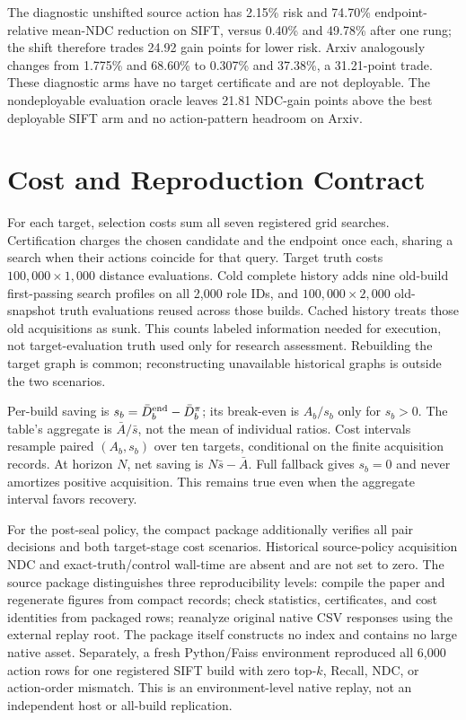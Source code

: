 \documentclass[sigconf,anonymous]{acmart}
\begin{document}
The diagnostic unshifted source action has 2.15\% risk and 74.70\% endpoint-relative mean-NDC reduction on SIFT, versus 0.40\% and 49.78\% after one rung; the shift therefore trades 24.92 gain points for lower risk. Arxiv analogously changes from 1.775\% and 68.60\% to 0.307\% and 37.38\%, a 31.21-point trade. These diagnostic arms have no target certificate and are not deployable. The nondeployable evaluation oracle leaves 21.81 NDC-gain points above the best deployable SIFT arm and no action-pattern headroom on Arxiv.

\section{Cost and Reproduction Contract}
For each target, selection costs sum all seven registered grid searches. Certification charges the chosen candidate and the endpoint once each, sharing a search when their actions coincide for that query. Target truth costs $100{,}000\times1{,}000$ distance evaluations. Cold complete history adds nine old-build first-passing search profiles on all 2,000 role IDs, and $100{,}000\times2{,}000$ old-snapshot truth evaluations reused across those builds. Cached history treats those old acquisitions as sunk. This counts labeled information needed for execution, not target-evaluation truth used only for research assessment. Rebuilding the target graph is common; reconstructing unavailable historical graphs is outside the two scenarios.

Per-build saving is $s_b=\bar D_b^{\rm end}-\bar D_b^{\pi}$; its break-even is $A_b/s_b$ only for $s_b>0$. The table's aggregate is $\bar A/\bar s$, not the mean of individual ratios. Cost intervals resample paired $(A_b,s_b)$ over ten targets, conditional on the finite acquisition records. At horizon $N$, net saving is $N\bar s-\bar A$. Full fallback gives $s_b=0$ and never amortizes positive acquisition. This remains true even when the aggregate interval favors recovery.

For the post-seal policy, the compact package additionally verifies all pair decisions and both target-stage cost scenarios. Historical source-policy acquisition NDC and exact-truth/control wall-time are absent and are not set to zero. The source package distinguishes three reproducibility levels: compile the paper and regenerate figures from compact records; check statistics, certificates, and cost identities from packaged rows; reanalyze original native CSV responses using the external replay root. The package itself constructs no index and contains no large native asset. Separately, a fresh Python/Faiss environment reproduced all 6,000 action rows for one registered SIFT build with zero top-$k$, Recall, NDC, or action-order mismatch. This is an environment-level native replay, not an independent host or all-build replication.
\end{document}
